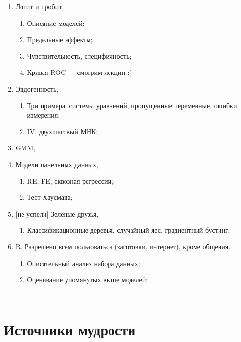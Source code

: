 \documentclass[12pt]{article}
\begin{document}
\begin{enumerate}
 \item Логит и пробит,  \cite{schmidheiny2016guides}
 \begin{enumerate}
 \item Описание моделей;
 \item Предельные эффекты;
 \item Чувствительность, специфичность;
 \item Кривая ROC — смотрим лекции :)
 \end{enumerate}

 \item Эндогенность,  \cite{schmidheiny2016guides}
 \begin{enumerate}
 \item Три примера: системы уравнений, пропущенные переменные, ошибки измерения;
 \item IV, двухшаговый МНК;
 \end{enumerate}

 \item GMM, \cite{creel2018econometrics}

 \item Модели панельных данных, \cite{schmidheiny2016guides}
 \begin{enumerate}
 \item  RE, FE, сквозная регрессии;
 \item  Тест Хаусмана;
 \end{enumerate}

 \item {[не успели]} Зелёные друзья, \cite{decrouez2018mmdm}
 \begin{enumerate}
 \item Классификационные деревья, случайный лес, градиентный бустинг;
 \end{enumerate}

 \item R. Разрешено всем пользоваться (заготовки, интернет), кроме общения.
 \begin{enumerate}
 \item Описательный анализ набора данных;
 \item Оценивание упомянутых выше моделей;
 \end{enumerate}

\end{enumerate}
­
\section*{Источники мудрости}
\printbibliography[heading=none]
\end{document}
